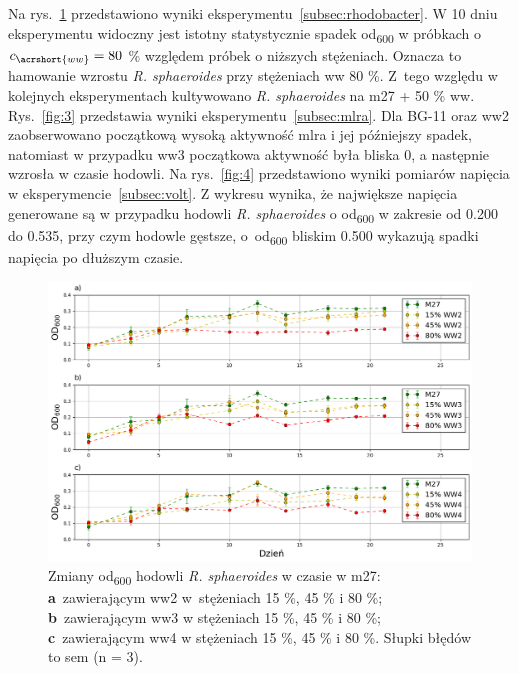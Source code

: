 Na rys.~\ref{fig:2} przedstawiono wyniki
eksperymentu~\ref{subsec:rhodobacter}.
W 10 dniu eksperymentu widoczny jest istotny
statystycznie spadek \acrshort{od}\textsubscript{600}
w próbkach o $c_{\acrshort{ww}} = 80$ \% względem próbek
o niższych stężeniach.
Oznacza to hamowanie wzrostu \textit{R. sphaeroides}
przy stężeniach \acrshort{ww} 80 \%.
Z~tego względu w kolejnych eksperymentach kultywowano
\textit{R. sphaeroides} na \acrshort{m27} + 50 \% \acrshort{ww}\@.
Rys.~\ref{fig:3} przedstawia wyniki
eksperymentu~\ref{subsec:mlra}.
Dla BG-11 oraz \acrshort{ww}2 zaobserwowano początkową wysoką
aktywność \acrshort{mlra} i jej późniejszy spadek, natomiast
w przypadku \acrshort{ww}3 początkowa aktywność była bliska 0,
a następnie wzrosła w czasie hodowli.
Na rys.~\ref{fig:4} przedstawiono wyniki pomiarów
napięcia w eksperymencie~\ref{subsec:volt}.
Z wykresu wynika, że największe napięcia generowane
są w przypadku hodowli \textit{R. sphaeroides}
o \acrshort{od}\textsubscript{600} w zakresie od 0.200 do 0.535,
przy czym hodowle gęstsze, o~\acrshort{od}\textsubscript{600} bliskim
0.500 wykazują spadki napięcia po dłuższym czasie.

\begin{figure}[t!]
    \centering
    \includegraphics[width=13cm]{figures/ww}
    \caption{
        Zmiany \acrshort{od}\textsubscript{600} hodowli \textit{R. sphaeroides} w czasie w \acrshort{m27}:
        \textbf{a}~zawierającym \acrshort{ww}2 w~stężeniach 15 \%, 45 \% i 80 \%;
        \textbf{b}~zawierającym \acrshort{ww}3 w stężeniach 15 \%, 45 \% i 80 \%;
        \textbf{c}~zawierającym \acrshort{ww}4 w stężeniach 15 \%, 45 \% i 80 \%.
        Słupki błędów to \acrshort{sem} (n = 3).
    }
    \label{fig:2}
\end{figure}

